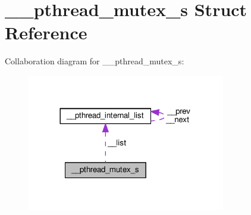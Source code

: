 \hypertarget{struct____pthread__mutex__s}{}\section{\+\_\+\+\_\+pthread\+\_\+mutex\+\_\+s Struct Reference}
\label{struct____pthread__mutex__s}


Collaboration diagram for \+\_\+\+\_\+pthread\+\_\+mutex\+\_\+s\+:\nopagebreak
\begin{figure}[H]
\begin{center}
\leavevmode
\includegraphics[width=245pt]{struct____pthread__mutex__s__coll__graph}
\end{center}
\end{figure}
